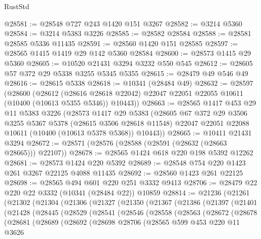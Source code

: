 \begin{lexlean}{RustStd}
\begin{coremodule}
{\begin{coremodule}
{{{{{{{{{{{{{{{{{{{{{{{{{@28581 := @28548 @727 @243 @1420 @151 @3267
@28582 := @3214 @5360
@28584 := @3214 @5383 @3226
@28585 := @28582 @28584
@28588 := @28581 @28585 @5336 @11435
@28591 := @28560 @1420 @151 @28585
@28597 := @28565 @1415 @1419 @29 @142 @5360 @28584
@28600 := @28573 @1415 @29 @5360
@28605 := @10520 @21431 @3294 @3232 @550 @545
@28612 := @28605 @57 @372 @29 @5338 @3255 @5345 @5355
@28615 := @28479 @49 @546 @49
@28616 := @28615 @5338
@28618 := @10341 (@28484 @49)
@28632 := @28597
    (@28600
      (@28612
        (@28616 @28618 @22042)
        @22047
        @22051
        @22055
        @10611
        (@10400 (@10613 @5355 @5346))
        @10443))
@28663 := @28565
    @1417
    @453
    @29
    @11
    @5383
    @3226
    (@28573
      @1417
      @29
      @5383
      (@28605
        @67
        @372
        @29
        @3506
        @3255
        @5367
        @5378
        (@28615 @3506 @28618 @11548)
        @22047
        @22051
        @22088
        @10611
        (@10400 (@10613 @5378 @5368))
        @10443))
@28665 := @10411 @21431 @3294
@28672 := @28571 (@28576 (@28588 (@28591 (@28632 (@28663 @28665))) @22107))
@28678 := @28565 @1424 @618 @220 @198 @5392 @12262
@28681 := @28573 @1424 @220 @5392
@28689 := @28548 @754 @220 @1423 @261 @3267 @22125 @4088 @11435
@28692 := @28560 @1423 @261 @22125
@28698 := @28565 @494 @601 @220 @251 @3332 @9413
@28706 := @28479 @22 @220 @22 @3332 (@10341 (@28484 @22)) @10859
@28814 := @21236
    (@21261
      (@21302
        (@21304
          (@21306
            (@21327
              (@21350
                (@21367
                  (@21386
                    (@21397
                      (@21401
                        (@21428
                          (@28445
                            (@28529
                              (@28541
                                (@28546
                                  (@28558
                                    (@28563
                                      (@28672
                                        (@28678
                                          (@28681
                                            (@28689
                                              (@28692
                                                (@28698
                                                  @28706
                                                  (@28565
                                                    @599
                                                    @453
                                                    @220
                                                    @11
                                                    @3626
}}}}}}}}}}}}}}}}}}}}}}}}}
\end{coremodule}}
\end{coremodule}
\end{lexlean}
